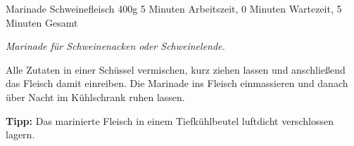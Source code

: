 \begin{recipe}{Marinade Schweinefleisch} {400g} {5 Minuten Arbeitszeit, 0 Minuten Wartezeit, 5 Minuten Gesamt}

  \freeform{}\textit{Marinade für Schweinenacken oder Schweinelende.}


  Alle Zutaten in einer Schüssel vermischen, kurz ziehen lassen und anschließend das Fleisch damit einreiben.
  Die Marinade ins Fleisch einmassieren und danach über Nacht im Kühlschrank ruhen lassen.

  \freeform{}\hrulefill{}

  \freeform{}\textbf{Tipp:}
  Das marinierte Fleisch in einem Tiefkühlbeutel luftdicht verschlossen lagern.

\end{recipe}
